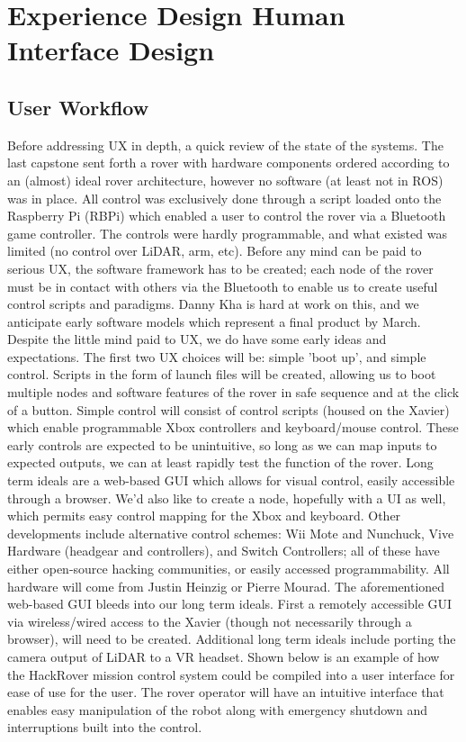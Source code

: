 \documentclass[a4paper, 10pt]{article}
\begin{document}
\pagebreak
		
\section{Experience Design \- Human Interface Design}
	\subsection{User Workflow}
	Before addressing UX in depth, a quick review of the state of the systems. The last capstone sent forth a rover with hardware components ordered according to an (almost) ideal rover architecture, however no software (at least not in ROS) was in place. All control was exclusively done through a script loaded onto the Raspberry Pi (RBPi) which enabled a user to control the rover via a Bluetooth game controller. The controls were hardly programmable, and what existed was limited (no control over LiDAR, arm, etc). Before any mind can be paid to serious UX, the software framework has to be created; each node of the rover must be in contact with others via the Bluetooth to enable us to create useful control scripts and paradigms. Danny Kha is hard at work on this, and we anticipate early software models which represent a final product by March. 
Despite the little mind paid to UX, we do have some early ideas and expectations. The first two UX choices will be: simple 'boot up', and simple control. Scripts in the form of launch files will be created, allowing us to boot multiple nodes and software features of the rover in safe sequence and at the click of a button. Simple control will consist of control scripts (housed on the Xavier) which enable programmable Xbox controllers and keyboard/mouse control. These early controls are expected to be unintuitive, so long as we can map inputs to expected outputs, we can at least rapidly test the function of the rover. 
Long term ideals are a web-based GUI which allows for visual control, easily accessible through a browser. We'd also like to create a node, hopefully with a UI as well, which permits easy control mapping for the Xbox and keyboard. Other developments include alternative control schemes: Wii Mote and Nunchuck, Vive Hardware (headgear and controllers), and Switch Controllers; all of these have either open-source hacking communities, or easily accessed programmability. All hardware will come from Justin Heinzig or Pierre Mourad. 
The aforementioned web-based GUI bleeds into our long term ideals. First a remotely accessible GUI via wireless/wired access to the Xavier (though not necessarily through a browser), will need to be created. Additional long term ideals include porting the camera output of LiDAR to a VR headset. 
Shown below is an example of how the HackRover mission control system could be compiled into a user interface for ease of use for the user. The rover operator will have an intuitive interface that enables easy manipulation of the robot along with emergency shutdown and interruptions built into the control. 
\end{document}
